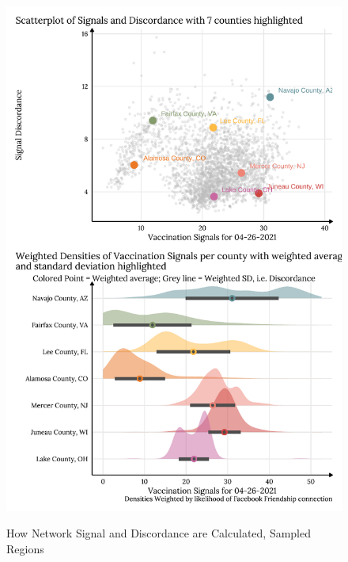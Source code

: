 \begin{figure}
{\centering \includegraphics[width=0.7\linewidth]{figs/paper3/assortativity-vacc-1}}
\caption{How Network Signal and Discordance are Calculated, Sampled Regions}\label{fig:assortativity-vacc}
\end{figure}

